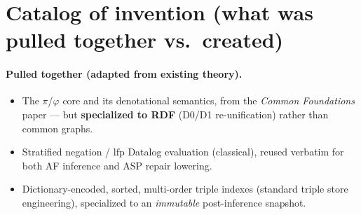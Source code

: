 \documentclass[11pt]{article}
\newcommand{\lfp}{\mathrm{lfp}}
\theoremstyle{definition}
\begin{document}
\section{Catalog of invention (what was pulled together vs.\ created)}

\paragraph{Pulled together (adapted from existing theory).}
\begin{itemize}[leftmargin=1.4em]
  \item The $\pi$/$\varphi$ core and its denotational semantics, from the
  \emph{Common Foundations} paper --- but \textbf{specialized to RDF} (D0/D1
  re-unification) rather than common graphs.
  \item Stratified negation / $\lfp$ Datalog evaluation (classical), reused
  verbatim for both AF inference and ASP repair lowering.
  \item Dictionary-encoded, sorted, multi-order triple indexes (standard triple
  store engineering), specialized to an \emph{immutable} post-inference snapshot.
\end{itemize}
\end{document}
